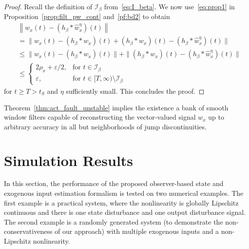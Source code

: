 \documentclass[times, doublespace]{rncauth}
\begin{document}
\begin{proof}
	Recall the definition of $\mathcal I_\beta$ from~\eqref{eq:I_beta}. We now use~\eqref{eq:prop1} in Proposition~\ref{prop:filt_pw_cont} and~\eqref{pf:bd2} to obtain
	\begin{align*}
	&\left\|w_x(t) - (h_\beta\ast \hat w^\eta_x)(t)\right\|\\
	&= \|w_x(t) - (h_\beta\ast w_x)(t) + (h_\beta\ast w_x)(t) -(h_\beta\ast \hat w^\eta_x)(t)\|\\
	&\le \|w_x(t) - (h_\beta\ast w_x)(t)\| + \|(h_\beta\ast w_x)(t) -(h_\beta\ast \hat w^\eta_x)(t)\|\\
	&\le \begin{cases}
	2\rho_x + \varepsilon/2, & \text{for }t\in \mathcal I_\beta\\
	\varepsilon, & \text{for } t\in [T, \infty)\setminus\mathcal{I}_\beta
	\end{cases}
	\end{align*}
	for $t\ge T>t_S$ and $\eta$ sufficiently small. This concludes the proof.
\end{proof}
Theorem~\ref{thm:act_fault_unstable} implies the existence a bank of smooth window filters capable of reconstructing the vector-valued signal $w_x$ up to arbitrary accuracy in all but neighborhoods of jump discontinuities.

\section{Simulation Results}\label{sec:ex}
In this section, the performance of the proposed observer-based state and exogenous input estimation formalism is tested on two numerical examples. The first example is a practical system, where the nonlinearity is globally Lipschitz continuous and there is one state disturbance and one output disturbance signal. The second example is a randomly generated system (to demonstrate the non-conservativeness of our approach) with multiple exogenous inputs and a non-Lipschitz nonlinearity.
\end{document}
